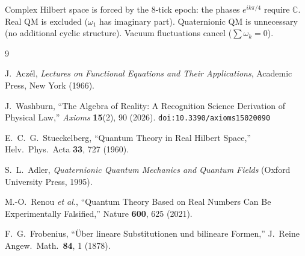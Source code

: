 \documentclass[12pt,a4paper]{article}
\theoremstyle{definition}
\theoremstyle{remark}
\begin{document}
Complex Hilbert space is forced by the 8-tick epoch: the phases
$e^{ik\pi/4}$ require $\mathbb{C}$.  Real QM is excluded
($\omega_1$ has imaginary part).  Quaternionic QM is unnecessary
(no additional cyclic structure).  Vacuum fluctuations cancel
($\sum \omega_k = 0$).

\begin{thebibliography}{9}

J.~Acz\'el, \emph{Lectures on Functional Equations and Their Applications},
Academic Press, New York (1966).

J.~Washburn, ``The Algebra of Reality: A Recognition Science Derivation
of Physical Law,'' \emph{Axioms} \textbf{15}(2), 90 (2026).
\texttt{doi:10.3390/axioms15020090}

E.~C.~G.~Stueckelberg, ``Quantum Theory in Real Hilbert Space,''
Helv.\ Phys.\ Acta \textbf{33}, 727 (1960).

S.~L.~Adler, \textit{Quaternionic Quantum Mechanics and Quantum Fields}
(Oxford University Press, 1995).

M.-O.~Renou \emph{et al.}, ``Quantum Theory Based on Real Numbers
Can Be Experimentally Falsified,'' Nature \textbf{600}, 625 (2021).

F.~G.~Frobenius, ``\"Uber lineare Substitutionen und bilineare
Formen,'' J.\ Reine Angew.\ Math.\ \textbf{84}, 1 (1878).
\end{thebibliography}
\end{document}
